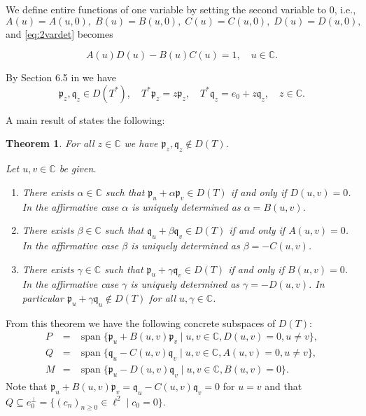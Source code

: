 \documentclass [12pt]{article}
\DeclareMathOperator{\spn}{span}
\newtheorem{thm}{Theorem}[section]
\newcommand{\C}{\mathbb{C}}
\begin{document}
We define entire functions of one variable by setting the second variable to 0, i.e., 
\begin{equation}\label{eq:A-D}
A(u)=A(u,0),\;B(u)=B(u,0),\;C(u)=C(u,0),\;D(u)=D(u,0),
\end{equation}
and \eqref{eq:2vardet} becomes

\begin{equation}\label{eq:det}
A(u)D(u)-B(u)C(u)=1,\quad u\in\C.
\end{equation}

By Section 6.5 in \cite{Sch} we have
\begin{equation}\label{eq:p,q}
\mathfrak{p}_z, \mathfrak{q}_z \in D(T^*),\quad T^*\mathfrak{p}_z=z\mathfrak{p}_z, 
\quad T^*\mathfrak{q}_z=e_0+z\mathfrak{q}_z,\quad z\in\C.
\end{equation}

A main result of \cite{B:S5} states the following:

\begin{thm}\label{thm:pqmain} For all $z\in\C$ we have $\mathfrak{p}_z, \mathfrak{q}_z\notin D(T)$.

Let $u,v\in\C$ be given.
\begin{enumerate}
\item[(i)] There exists $\alpha\in\C$ such that $\mathfrak{p}_u+\alpha \mathfrak{p}_v\in D(T)$ if and only if $D(u,v)=0$. In the affirmative case $\alpha$  is uniquely determined as
$\alpha=B(u,v)$. 

\item[(ii)] There exists $\beta\in\C$ such that $\mathfrak{q}_u+\beta \mathfrak{q}_v\in D(T)$ if and only if $A(u,v)=0$. In the affirmative case $\beta$  is uniquely determined as $\beta=-C(u,v)$.

\item[(iii)] There exists $\gamma\in\C$ such that $\mathfrak{p}_u+\gamma \mathfrak{q}_v\in D(T)$ if and only if $B(u,v)=0$. In the affirmative case $\gamma$  is uniquely determined as $\gamma=-D(u,v)$. In particular $\mathfrak{p}_u+\gamma\mathfrak{q}_u\notin D(T)$ for all $u, \gamma\in\C$.
\end{enumerate}
\end{thm}

From  this theorem we have the following concrete subspaces of $D(T)$:
\begin{eqnarray*}
P&=&\spn\{\mathfrak{p}_u+B(u,v){\mathfrak{p}}_v \mid u,v\in\C, D(u,v)=0, u\neq v\},\\
Q&=&\spn\{\mathfrak{q}_u-C(u,v){\mathfrak{q}}_v \mid u,v\in\C, A(u,v)=0, u\neq v\},\\
M&=&\spn\{\mathfrak{p}_u-D(u,v){\mathfrak{q}}_v \mid u,v\in\C, B(u,v)=0\}.
\end{eqnarray*}
Note that $\mathfrak{p}_u+B(u,v)\mathfrak{p}_{v} =\mathfrak{q}_u-C(u,v)\mathfrak{q}_v=0$  for $u=v$ and that $Q\subseteq e_0^\perp=\{(c_n)_{n\ge 0}\in\ell^2 \mid c_0=0\}$.
\end{document}

